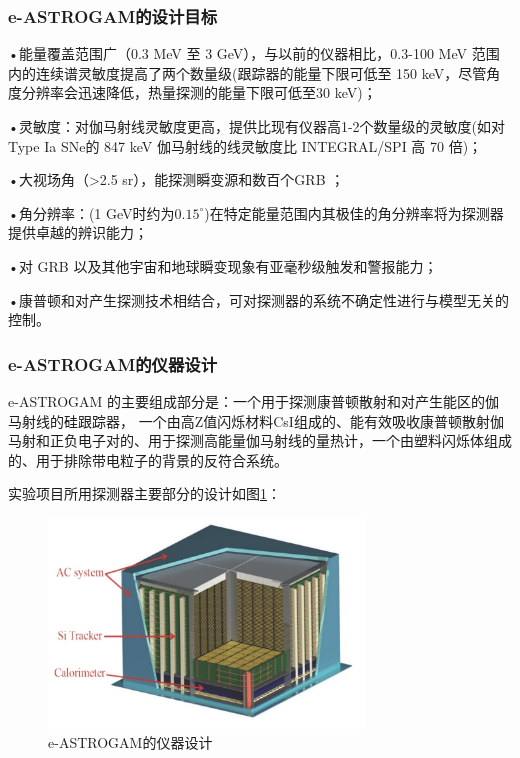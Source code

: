 \subsubsection{e-ASTROGAM的设计目标}
•能量覆盖范围广（0.3 MeV 至 3 GeV），与以前的仪器相比，0.3-100 MeV 范围内的连续谱灵敏度提高了两个数量级(跟踪器的能量下限可低至 150 keV，尽管角度分辨率会迅速降低，热量探测的能量下限可低至30 keV)；\par
•灵敏度：对伽马射线灵敏度更高，提供比现有仪器高1-2个数量级的灵敏度(如对Type Ia SNe的 847 keV 伽马射线的线灵敏度比 INTEGRAL/SPI 高 70 倍)；\par
•大视场角（>2.5 sr），能探测瞬变源和数百个GRB ；\par
•角分辨率：(1 GeV时约为$0.15^{\circ}$)在特定能量范围内其极佳的角分辨率将为探测器提供卓越的辨识能力；\par
•对 GRB 以及其他宇宙和地球瞬变现象有亚毫秒级触发和警报能力；\par
•康普顿和对产生探测技术相结合，可对探测器的系统不确定性进行与模型无关的控制。
\subsubsection{e-ASTROGAM的仪器设计}
e-ASTROGAM 的主要组成部分是：一个用于探测康普顿散射和对产生能区的伽马射线的硅跟踪器，
一个由高Z值闪烁材料CsI组成的、能有效吸收康普顿散射伽马射和正负电子对的、用于探测高能量伽马射线的量热计，一个由塑料闪烁体组成的、用于排除带电粒子的背景的反符合系统。\par
实验项目所用探测器主要部分的设计如图\ref{fig:e-ASTROGAM}：
\begin{figure}[H]
	\centering
	\includegraphics[width=0.75\textwidth]{figures/e-ASTROGAM实验设备具体.png}
	\caption{e-ASTROGAM的仪器设计} \label{fig:e-ASTROGAM}
\end{figure}


